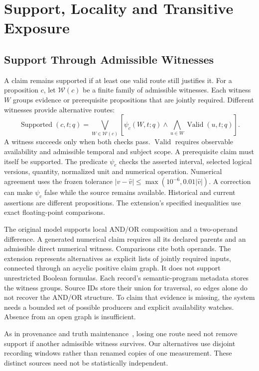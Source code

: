 \section{Support, Locality and Transitive Exposure}
\label{sec:theory}

\subsection{Support Through Admissible Witnesses}

A claim remains supported if at least one valid route still justifies it.
For a proposition $c$, let $\mathcal W(c)$ be a finite family of admissible
witnesses. Each witness $W$ groups evidence or prerequisite propositions that
are jointly required. Different witnesses provide alternative routes:
\begin{equation}
 \operatorname{Supported}(c,t;q)=
 \bigvee_{W\in\mathcal W(c)}
 \left[\psi_c(W,t;q)\land
       \bigwedge_{u\in W}\operatorname{Valid}(u,t;q)\right].
\label{eq:support}
\end{equation}
A witness succeeds only when both checks pass.
$\operatorname{Valid}$ requires observable availability and admissible temporal
and subject scope. A prerequisite claim must itself be supported.
The predicate $\psi_c$ checks the asserted interval, selected logical versions,
quantity, normalized unit and numerical operation. Numerical agreement uses the
frozen tolerance $|v-\widehat v|\leq\max(10^{-6},0.01|\widehat v|)$.
A correction can make $\psi_c$ false while the source remains available. Historical and current assertions are different propositions. The extension's specified inequalities use exact floating-point comparisons.

The original model supports local AND/OR composition and a two-operand
difference. A generated numerical claim requires all its declared parents and
an admissible direct numerical witness. Comparisons cite both operands.
The extension represents alternatives as explicit lists of jointly required
inputs, connected through an acyclic positive claim graph. It does not support
unrestricted Boolean formulas. Each record's semantic-program metadata stores
the witness groups. Source IDs store their union for traversal, so edges alone
do not recover the AND/OR structure. To claim that evidence is missing, the
system needs a bounded set of possible producers and explicit availability
watches. Absence from an open graph is insufficient.

As in provenance and truth maintenance~\cite{green2007,doyle1979}, losing one
route need not remove support if another admissible witness survives.
Our alternatives use disjoint recording windows rather than renamed copies of
one measurement. These distinct sources need not be statistically independent.

